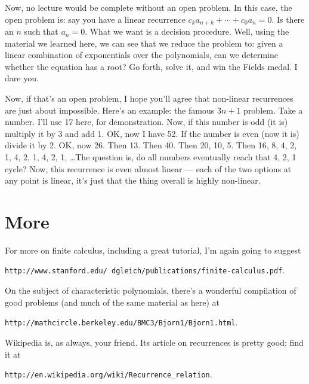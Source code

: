 \documentclass[12pt,letterpaper]{article}
\begin{document}
Now, no lecture would be complete without an open problem. In this case, the
open problem is: say you have a linear recurrence $c_k a_{n+k} + \cdots + c_0 a_n = 0$.
Is there an $n$ such that $a_n = 0$. What we want is a decision procedure. Well,
using the material we learned here, we can see that we reduce the problem to:
given a linear combination of exponentials over the polynomials, can we determine
whether the equation has a root? Go forth, solve it, and win the Fields medal.
I dare you.

Now, if that's an open problem, I hope you'll agree that non-linear recurrences
are just about impossible. Here's an example: the famous $3n+1$ problem. Take a
number. I'll use 17 here, for demonstration. Now, if this number is odd (it is)
multiply it by 3 and add 1. OK, now I have 52. If the number is even (now it is)
divide it by 2. OK, now 26. Then 13. Then 40. Then 20, 10, 5. Then 16, 8, 4, 2, 1,
4, 2, 1, 4, 2, 1, \dots The question is, do all numbers eventually reach that
4, 2, 1 cycle? Now, this recurrence is even almost linear --- each of the two
options at any point is linear, it's just that the thing overall is highly non-linear.

\section{More}
For more on finite calculus, including a great tutorial, I'm again going to suggest
\begin{center}\texttt{http://www.stanford.edu/\string~dgleich/publications/finite-calculus.pdf}.\end{center}

On the subject of characteristic polynomials, there's a wonderful
compilation of good problems (and much of the same material as here)
at
\begin{center}\texttt{http://mathcircle.berkeley.edu/BMC3/Bjorn1/Bjorn1.html}.\end{center}

Wikipedia is, as always, your friend. Its article on recurrences
is pretty good; find it at
\begin{center}\texttt{http://en.wikipedia.org/wiki/Recurrence\string_relation}.\end{center}
\end{document}
